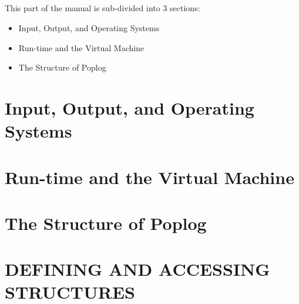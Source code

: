 

\chapter*{}
\begin{flushright}
\vspace{1in}
\parbox{5.2in}{


This part of the manual is sub-divided into 3 sections:

\begin{itemize}
  \item Input, Output, and Operating Systems
  \item Run-time and the Virtual Machine
  \item The Structure of Poplog
\end{itemize}
}
\end{flushright}


\part*{Input, Output, and Operating Systems}



\part*{Run-time and the Virtual Machine}




\part*{The Structure of Poplog}



\part{DEFINING AND ACCESSING STRUCTURES}



